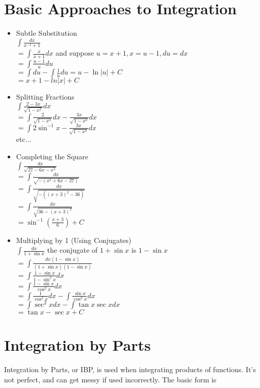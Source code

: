 \documentclass{article}
\begin{document}
\section{Basic Approaches to Integration}
\begin{itemize}
  \item {
  Subtle Substitution\\
  $\int\frac{dx}{x^{-1}+1}$\\
  $=\int\frac{x}{x+1}dx$ and suppose $u = x + 1, x = u - 1, du = dx$\\
  $=\int\frac{u-1}{u}du$\\
  $=\int du - \int \frac{1}{u}du = u - \ln|u| + C$\\
  $= x+1 - ln|x| + C$
  }
  \item {
  Splitting Fractions\\
  $\int\frac{2-3x}{\sqrt{1-x^2}}dx$\\
  $=\int\frac{2}{\sqrt{1-x^2}}dx - \frac{3x}{\sqrt{1-x^2}}dx$\\
  $=\int 2\sin^{-1}x - \frac{3x}{\sqrt{1-x^2}}dx$\\
  etc...
  }
  \item {
  Completing the Square\\
  $\int\frac{dx}{\sqrt{27 - 6x - x^2}}$\\
  $=\int\frac{dx}{\sqrt{-(x^2 +6x -27)}}$\\
  $=\int\frac{dx}{\sqrt{-((x+3)^2 -36)}}$\\
  $=\int\frac{dx}{\sqrt{36 - (x+3)^2}}$\\
  $=\sin^{-1}(\frac{x+3}{6}) + C$\\
  }
  \item {
  Multiplying by 1 (Using Conjugates)\\
  $\int\frac{dx}{1 + \sin x}$ the conjugate of $1 + \sin x$ is $1 - \sin x$\\
  $=\int\frac{dx (1 - \sin x)}{(1 + \sin x)(1 - \sin x)}$\\
  $=\int\frac{1 - \sin x}{1 - \sin^2 x}dx$\\
  $=\int\frac{1 - \sin x}{\cos^2 x}dx$\\
  $=\int\frac{1}{\cos^2 x}dx - \int\frac{\sin x}{\cos^2 x}dx$\\
  $=\int \sec^2 x dx - \int \tan x \sec x dx$\\
  $=\tan x - \sec x + C$\\
  }
\end{itemize}

\section{Integration by Parts}
Integration by Parts, or IBP, is used when integrating products of functions. It's not perfect, and can get messy if used incorrectly. The basic form is\\
\end{document}
